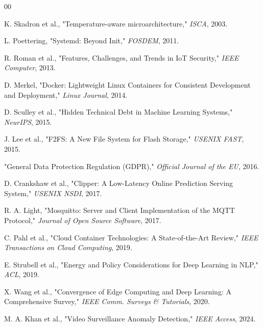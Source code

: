 \documentclass[conference]{IEEEtran}
\begin{document}
\begin{thebibliography}{00}

 K. Skadron et al., "Temperature-aware microarchitecture," \textit{ISCA}, 2003.

 L. Poettering, "Systemd: Beyond Init," \textit{FOSDEM}, 2011.

 R. Roman et al., "Features, Challenges, and Trends in IoT Security," \textit{IEEE Computer}, 2013.


 D. Merkel, "Docker: Lightweight Linux Containers for Consistent Development and Deployment," \textit{Linux Journal}, 2014.


 D. Sculley et al., "Hidden Technical Debt in Machine Learning Systems," \textit{NeurIPS}, 2015.


 J. Lee et al., "F2FS: A New File System for Flash Storage," \textit{USENIX FAST}, 2015.

 "General Data Protection Regulation (GDPR)," \textit{Official Journal of the EU}, 2016.

 D. Crankshaw et al., "Clipper: A Low-Latency Online Prediction Serving System," \textit{USENIX NSDI}, 2017.

 R. A. Light, "Mosquitto: Server and Client Implementation of the MQTT Protocol," \textit{Journal of Open Source Software}, 2017.


 C. Pahl et al., "Cloud Container Technologies: A State-of-the-Art Review," \textit{IEEE Transactions on Cloud Computing}, 2019.


 E. Strubell et al., "Energy and Policy Considerations for Deep Learning in NLP," \textit{ACL}, 2019.

 X. Wang et al., "Convergence of Edge Computing and Deep Learning: A Comprehensive Survey," \textit{IEEE Comm. Surveys \& Tutorials}, 2020.


 M. A. Khan et al., "Video Surveillance Anomaly Detection," \textit{IEEE Access}, 2024.

\end{thebibliography}
\end{document}
